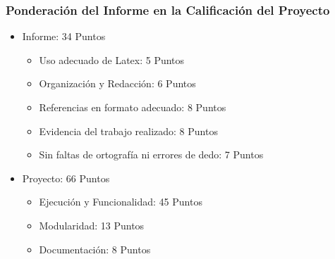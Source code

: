 \begin{frame}
\frametitle{Ponderación del Informe en la Calificación del Proyecto}
\begin{itemize}
\item Informe: 34 Puntos
\begin{itemize}
\item Uso adecuado de Latex: 5 Puntos
\item Organizaci\'on y Redacci\'on: 6 Puntos
\item Referencias en formato adecuado: 8 Puntos
\item Evidencia del trabajo realizado: 8 Puntos
\item Sin faltas de ortografía ni errores de dedo: 7 Puntos
\end{itemize}
\item Proyecto: 66 Puntos
\begin{itemize}
\item Ejecución y Funcionalidad: 45 Puntos
\item Modularidad: 13 Puntos
\item Documentación: 8 Puntos
\end{itemize}
\end{itemize}
\end{frame}





